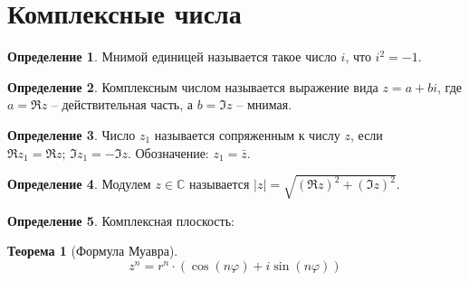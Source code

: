\documentclass[12pt]{article}
\theoremstyle{definition}
\newtheorem{theorem}{Теорема}[section]
\newtheorem{definition}{Определение}
\newcommand{\clx}{\mathbb{C}}
\begin{document}
    \section{Комплексные числа}
    \begin{definition}
        Мнимой единицей называется такое число $i$, что $i^2=-1$.
    \end{definition}
    \begin{definition}
        Комплексным числом называется выражение вида $z=a+bi$, где $a=\Re z$ – действительная часть, а $b=\Im z$ – мнимая.
    \end{definition}
    \begin{definition}
        Число $z_1$ называется сопряженным к числу $z$, если $\Re z_1=\Re z;\,\Im z_1=-\Im z$. Обозначение: $z_1=\bar{z}$.
    \end{definition}
    \begin{definition}
        Модулем $z\in \clx$ называется $|z|=\sqrt{(\Re z)^2+(\Im z)^2}$.
    \end{definition}
    \begin{definition}
        Комплексная плоскость:
        \begin{center}
        \end{center}
    \end{definition}
    \begin{theorem}[Формула Муавра]
        $$z^n=r^n\cdot(\cos(n\varphi)+i\sin(n\varphi))$$
    \end{theorem}
\end{document}
